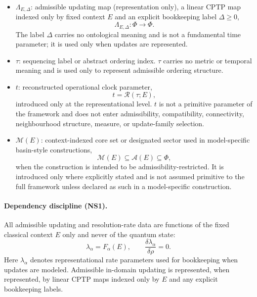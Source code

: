 \documentclass[aps,prx,onecolumn,11pt]{revtex4-2}
\theoremstyle{plain}
\theoremstyle{definition}
\theoremstyle{remark}
\begin{document}
\begin{itemize}

\item $\Lambda_{E,\Delta}$: admissible updating map (representation
only), a linear CPTP map indexed only by fixed context $E$ and an
explicit bookkeeping label $\Delta \ge 0$,
\begin{equation}
\Lambda_{E,\Delta} : \Phi \to \Phi.
\end{equation}
The label $\Delta$ carries no ontological meaning and is not a
fundamental time parameter; it is used only when updates are
represented.

\item $\tau$: sequencing label or abstract ordering index. $\tau$
carries no metric or temporal meaning and is used only to represent
admissible ordering structure.

\item $t$: reconstructed operational clock parameter,
\begin{equation}
t = \mathcal{R}(\tau;E),
\end{equation}
introduced only at the representational level. $t$ is not a primitive
parameter of the framework and does not enter admissibility,
compatibility, connectivity, neighbourhood structure, measure, or
update-family selection.

\item $\mathcal{M}(E)$: context-indexed core set or designated sector
used in model-specific basin-style constructions,
\begin{equation}
\mathcal{M}(E) \subseteq \mathcal{A}(E) \subseteq \Phi,
\end{equation}
when the construction is intended to be admissibility-restricted.
It is introduced only where explicitly stated and is not assumed
primitive to the full framework unless declared as such in a
model-specific construction.

\end{itemize}

\paragraph{Dependency discipline (NS1).}
All admissible updating and resolution-rate data are functions of the
fixed classical context $E$ only and never of the quantum state:
\begin{equation}
\lambda_\alpha = F_\alpha(E),
\qquad
\frac{\delta \lambda_\alpha}{\delta \rho} = 0.
\end{equation}
Here $\lambda_\alpha$ denotes representational rate parameters used for
bookkeeping when updates are modeled. Admissible in-domain updating is
represented, when represented, by linear CPTP maps indexed only by $E$
and any explicit bookkeeping labels.
\end{document}
